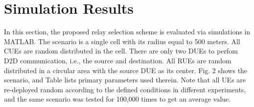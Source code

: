 \documentclass[conference]{IEEEtran}
\begin{document}
\section{Simulation Results}
In this section, the proposed relay selection scheme is evaluated via simulations in MATLAB. The scenario is a single cell with its radius equal to 500 meters. All CUEs are random distributed in the cell. There are only two DUEs to perfom D2D communication, i.e., the source and destination. All RUEs are random distributed in a circular area with the source DUE as its center. Fig. 2 shows the scenario, and Table \uppercase\expandafter{} lists primary parameters used therein. Note that all UEs are re-deployed random according to the defined conditions in different experiments, and the same scenario was tested for 100,000 times to get an average value.
\end{document}

